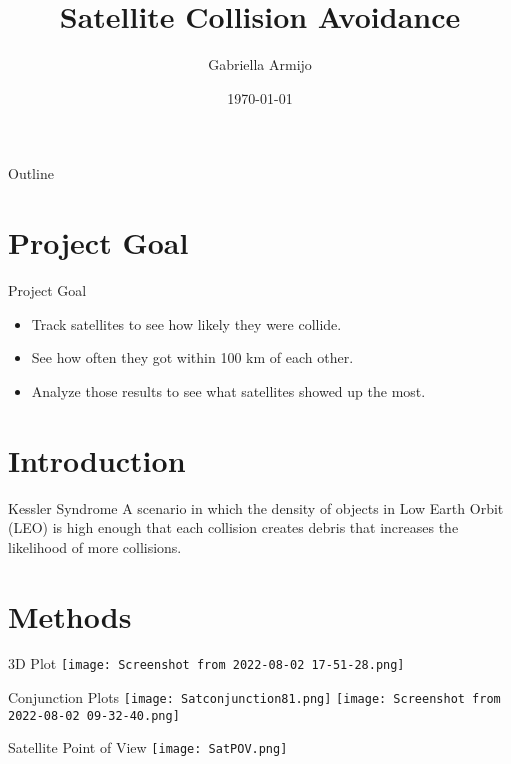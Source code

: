 \documentclass{beamer}
\title{Satellite Collision Avoidance}
\author{Gabriella Armijo}
\institute{Institute for Computing in Research}
\date{\today}
\begin{document}
\begin{frame}
    \titlepage 
\end{frame}

\logo{}


\begin{frame}{Outline}
    \tableofcontents
\end{frame}

\section{Project Goal}
\begin{frame}{Project Goal}
\begin{itemize}
\item Track satellites to see how likely they were collide. 
\item See how often they got within 100 km of each other. 
\item Analyze those results to see what satellites showed up the most.
\end{itemize}
\end{frame}

\section{Introduction}
\begin{frame}{Kessler Syndrome}
A scenario in which the density of objects in Low Earth Orbit (LEO) is high enough that each collision creates debris that increases the likelihood of more collisions.
\end{frame}

\section{Methods}
\begin{frame}{3D Plot}
\texttt{[image: Screenshot from 2022-08-02 17-51-28.png]}
\end{frame}

\begin{frame}{Conjunction Plots}
\texttt{[image: Satconjunction81.png]}
\texttt{[image: Screenshot from 2022-08-02 09-32-40.png]}
\end{frame}

\begin{frame}{Satellite Point of View}
\centering
\texttt{[image: SatPOV.png]}
\end{frame}
\end{document}
